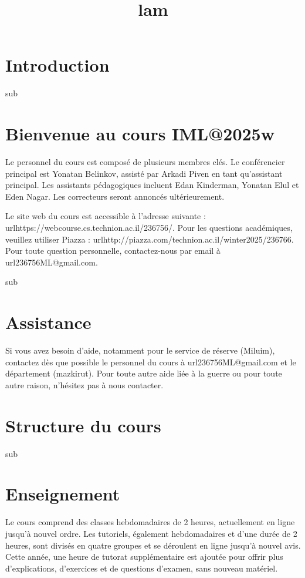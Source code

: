 \documentclass[12pt]{article}
\title{lam}
\author{}
\date{}
\begin{document}
\maketitle
\tableofcontents
\newpage

\section{Introduction}

sub\section{Bienvenue au cours IML@2025w}

Le personnel du cours est composé de plusieurs membres clés. Le conférencier principal est Yonatan Belinkov, assisté par Arkadi Piven en tant qu'assistant principal. Les assistants pédagogiques incluent Edan Kinderman, Yonatan Elul et Eden Nagar. Les correcteurs seront annoncés ultérieurement.

Le site web du cours est accessible à l'adresse suivante : url{https://webcourse.cs.technion.ac.il/236756/}. Pour les questions académiques, veuillez utiliser Piazza : url{http://piazza.com/technion.ac.il/winter2025/236766}. Pour toute question personnelle, contactez-nous par email à url{236756ML@gmail.com}.

sub\section{Assistance}

Si vous avez besoin d'aide, notamment pour le service de réserve (Miluim), contactez dès que possible le personnel du cours à url{236756ML@gmail.com} et le département (mazkirut). Pour toute autre aide liée à la guerre ou pour toute autre raison, n'hésitez pas à nous contacter.

\section{Structure du cours}

sub\section{Enseignement}

Le cours comprend des classes hebdomadaires de 2 heures, actuellement en ligne jusqu'à nouvel ordre. Les tutoriels, également hebdomadaires et d'une durée de 2 heures, sont divisés en quatre groupes et se déroulent en ligne jusqu'à nouvel avis. Cette année, une heure de tutorat supplémentaire est ajoutée pour offrir plus d'explications, d'exercices et de questions d'examen, sans nouveau matériel.
\end{document}
